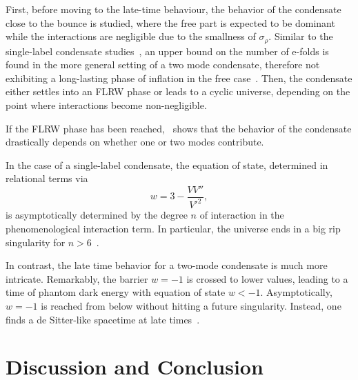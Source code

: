 \documentclass[11pt,a4paper]{article}
\begin{document}
First, before moving to the late-time behaviour, the behavior of the condensate close to the bounce is studied, where the free part is expected to be dominant while the interactions are negligible due to the smallness of $\sigma_{\rho}$. Similar to the single-label condensate studies~\cite{deCesare:2016rsf}, an upper bound on the number of e-folds is found in the more general setting of a two mode condensate, therefore not exhibiting a long-lasting phase of inflation in the free case~\cite{Oriti:2021rvm}. Then, the condensate either settles into an FLRW phase or leads to a cyclic universe, depending on the point where interactions become non-negligible.

If the FLRW phase has been reached,~\cite{Oriti:2021rvm} shows that the behavior of the condensate drastically depends on whether one or two modes contribute.

In the case of a single-label condensate, the equation of state, determined in relational terms via
%
\begin{equation}
w = 3-\frac{V V''}{V'^2},
\end{equation}
%
is asymptotically determined by the degree $n$ of interaction in the phenomenological interaction term. In particular, the universe ends in a big rip singularity for $n>6$~\cite{Oriti:2021rvm}.

In contrast, the late time behavior for a two-mode condensate is much more intricate. Remarkably, the barrier $w=-1$ is crossed to lower values, leading to a time of phantom dark energy with equation of state $w<-1$. Asymptotically, $w=-1$ is reached from below without hitting a future singularity. Instead, one finds a de Sitter-like spacetime at late times~\cite{Oriti:2021rvm}. 

\section{Discussion and Conclusion}\label{sec:Discussion and Conclusion}
\end{document}
